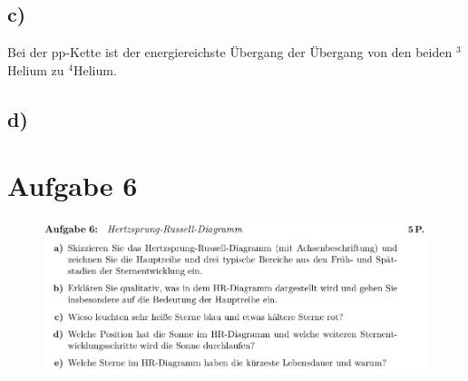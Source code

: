 \subsection{c)}
Bei der pp-Kette ist der energiereichste Übergang der Übergang von den beiden $^3$ Helium zu $^4$Helium.



\subsection{d)}


\section{Aufgabe 6}

\begin{figure}[H]
    \centering
    \includegraphics[width=\textwidth]{images/Aufgabe6.jpg}
    \label{fig:3}
\end{figure}

